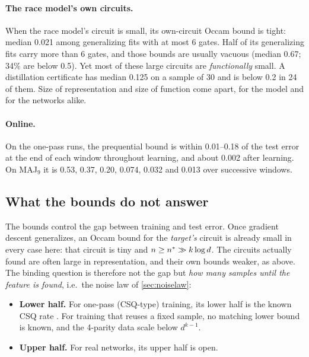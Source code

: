 \paragraph{The race model's own circuits.} When the race model's circuit is small, its own-circuit Occam bound is tight: median 0.021 among generalizing fits with at most 6 gates. Half of its generalizing fits carry more than 6 gates, and those bounds are usually vacuous (median 0.67; 34\% are below 0.5). Yet most of these large circuits are \emph{functionally} small. A distillation certificate has median 0.125 on a sample of 30 and is below 0.2 in 24 of them. Size of representation and size of function come apart, for the model and for the networks alike.

\paragraph{Online.} On the one-pass runs, the prequential bound is within 0.01–0.18 of the test error at the end of each window throughout learning, and about 0.002 after learning. On MAJ$_9$ it is 0.53, 0.37, 0.20, 0.074, 0.032 and 0.013 over successive windows.

\subsection{What the bounds do not answer}
The bounds control the gap between training and test error. Once gradient descent generalizes, an Occam bound for the \emph{target's} circuit is already small in every case here: that circuit is tiny and $n\ge n^{*}\gg k\log d$. The circuits actually found are often large in representation, and their own bounds weaker, as above. The binding question is therefore not the gap but \emph{how many samples until the feature is found}, i.e.\ the noise law of \cref{sec:noiselaw}:
\begin{itemize}
\item \textbf{Lower half.} For one-pass (CSQ-type) training, its lower half is the known CSQ rate \cite{abbe2023leap,abbe2021power}. For training that reuses a fixed sample, no matching lower bound is known, and the 4-parity data scale below $d^{k-1}$.
\item \textbf{Upper half.} For real networks, its upper half is open.
\end{itemize}
